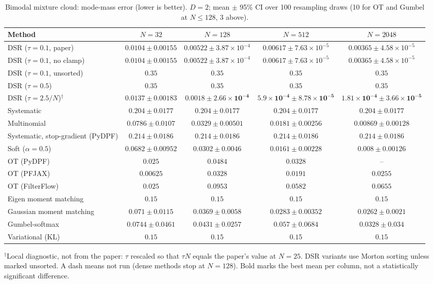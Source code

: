 \begin{table}[H]
\centering
\small
\caption{Bimodal mixture cloud: mode-mass error (lower is better). $D{=}2$; mean $\pm$ 95\% CI over 100 resampling draws (10 for OT and Gumbel at $N\le128$, 3 above).}
\label{tab:static-mixture-mode_mass_error}
\begin{adjustbox}{max width=\linewidth}
\begin{tabular}{lcccc}
\toprule
Method & $N{=}32$ & $N{=}128$ & $N{=}512$ & $N{=}2048$ \\
\midrule
DSR ($\tau{=}0.1$, paper) & $0.0104\pm0.00155$ & $0.00522\pm3.87\times10^{-4}$ & $0.00617\pm7.63\times10^{-5}$ & $0.00365\pm4.58\times10^{-5}$ \\
DSR ($\tau{=}0.1$, no clamp) & $0.0104\pm0.00155$ & $0.00522\pm3.87\times10^{-4}$ & $0.00617\pm7.63\times10^{-5}$ & $0.00365\pm4.58\times10^{-5}$ \\
DSR ($\tau{=}0.1$, unsorted) & $0.35$ & $0.35$ & $0.35$ & $0.35$ \\
DSR ($\tau{=}0.5$) & $0.35$ & $0.35$ & $0.35$ & $0.35$ \\
DSR ($\tau{=}2.5/N$)$^\dagger$ & $0.0137\pm0.00183$ & $\mathbf{0.0018\pm2.66\times10^{-4}}$ & $\mathbf{5.9\times10^{-4}\pm8.78\times10^{-5}}$ & $\mathbf{1.81\times10^{-4}\pm3.66\times10^{-5}}$ \\
\midrule
Systematic & $0.204\pm0.0177$ & $0.204\pm0.0177$ & $0.204\pm0.0177$ & $0.204\pm0.0177$ \\
Multinomial & $0.0786\pm0.0107$ & $0.0329\pm0.00501$ & $0.0181\pm0.00256$ & $0.00869\pm0.00128$ \\
Systematic, stop-gradient (PyDPF) & $0.214\pm0.0186$ & $0.214\pm0.0186$ & $0.214\pm0.0186$ & $0.214\pm0.0186$ \\
Soft ($\alpha{=}0.5$) & $0.0682\pm0.00952$ & $0.0302\pm0.0046$ & $0.0161\pm0.00228$ & $0.008\pm0.00126$ \\
OT (PyDPF) & $0.025$ & $0.0484$ & $0.0328$ & -- \\
OT (PFJAX) & $\mathbf{0.00625}$ & $0.0328$ & $0.0191$ & $0.0255$ \\
OT (FilterFlow) & $0.025$ & $0.0953$ & $0.0582$ & $0.0655$ \\
Eigen moment matching & $0.15$ & $0.15$ & $0.15$ & $0.15$ \\
Gaussian moment matching & $0.071\pm0.0115$ & $0.0369\pm0.0058$ & $0.0283\pm0.00352$ & $0.0262\pm0.0021$ \\
Gumbel-softmax & $0.0744\pm0.0461$ & $0.0431\pm0.0257$ & $0.057\pm0.0684$ & $0.0328\pm0.034$ \\
Variational (KL) & $0.15$ & $0.15$ & $0.15$ & $0.15$ \\
\bottomrule
\end{tabular}
\end{adjustbox}
\par\smallskip\parbox{0.95\linewidth}{\footnotesize $^\dagger$Local diagnostic, not from the paper: $\tau$ rescaled so that $\tau N$ equals the paper's value at $N{=}25$. DSR variants use Morton sorting unless marked unsorted. A dash means not run (dense methods stop at $N{=}128$). Bold marks the best mean per column, not a statistically significant difference.}
\end{table}

